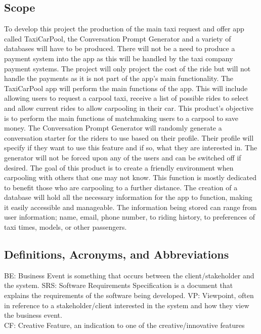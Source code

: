 \documentclass[]{article}
\begin{document}
\subsection{Scope}
\label{sub:scope}
To develop this project the production of the main taxi request and offer app called TaxiCarPool, the Conversation Prompt Generator and a variety of databases will have to be produced. There will not be a need to produce a payment system into the app as this will be handled by the taxi company payment systems. The project will only project the cost of the ride but will not handle the payments as it is not part of the app’s main functionality.
\newline \newline
The TaxiCarPool app will perform the main functions of the app. This will include allowing users to request a carpool taxi, receive a list of possible rides to select and allow current rides to allow carpooling in their car. This product’s objective is to perform the main functions of matchmaking users to a carpool to save money. 
\newline \newline
The Conversation Prompt Generator will randomly generate a conversation starter for the riders to use based on their profile. Their profile will specify if they want to use this feature and if so, what they are interested in. The generator will not be forced upon any of the users and can be switched off if desired. The goal of this product is to create a friendly environment when carpooling with others that one may not know. This function is mostly dedicated to benefit those who are carpooling to a further distance.
\newline \newline
The creation of a database will hold all the necessary information for the app to function, making it easily accessible and manageable. The information being stored can range from user information; name, email, phone number, to riding history, to preferences of taxi times, models, or other passengers. 

\subsection{Definitions, Acronyms, and Abbreviations}
\label{sub:definitions_acronyms_and_abbreviations}
BE: Business Event is something that occurs between the client/stakeholder and the system. 
\newline \newline
SRS: Software Requirements Specification is a document that explains the requirements of the software being developed.
\newline \newline
VP: Viewpoint, often in reference to a stakeholder/client interested in the system and how they view the business event. \\
CF: Creative Feature, an indication to one of the creative/innovative features
\end{document}
